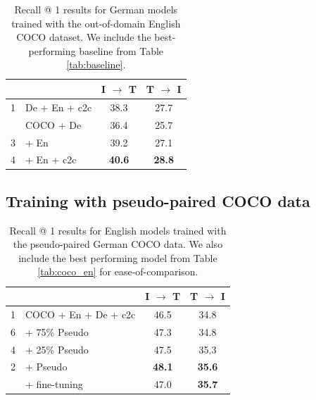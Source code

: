 \begin{table}[]
    \centering
    \renewcommand{\arraystretch}{1.0}
    \begin{tabular}{rlcc}
        \toprule
         & & I $\rightarrow$ T & T $\rightarrow$ I \\
         \midrule
         1 & De + En + c2c & 38.3 & 27.7 \\
         \hdashline
         2 & COCO + De & 36.4 & 25.7\\
         3 & \; + En & 39.2 & 27.1   \\
         4 & \; + En + c2c & \textbf{40.6} & \textbf{28.8} \\
         \bottomrule
    \end{tabular}
    \caption{Recall @ 1 results for German models trained with the out-of-domain English COCO dataset. We include the best-performing baseline from Table \ref{tab:baseline}.}\label{tab:coco_en_in_de}
\end{table}

\subsection{Training with pseudo-paired COCO data}

\begin{table}[]
    \centering
    \renewcommand{\arraystretch}{1.0}
    \begin{tabular}{rlcc}
        \toprule         
        & & I $\rightarrow$ T & T $\rightarrow$ I \\
        \midrule
        1 & COCO + En + De + c2c & 46.5 & 34.8 \\         
        \hdashline
        6 & \; + 75\% Pseudo & 47.3 & 34.8 \\
        4 & \; + 25\% Pseudo & 47.5 & 35.3\\
        2 & \; + Pseudo & \textbf{48.1} & \textbf{35.6}\\
        \hdashline
        2 & \; \; + fine-tuning & 47.0 & \textbf{35.7}\\
         \bottomrule
    \end{tabular}
    \caption{Recall @ 1 results for English models trained with the pseudo-paired German COCO data. We also include the best performing model from Table \ref{tab:coco_en} for ease-of-comparison.}\label{tab:coco_en-pseudo}
\end{table}

